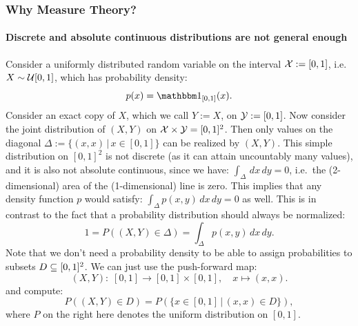 \subsubsection{Why Measure Theory?}%
%
\paragraph{Discrete and absolute continuous distributions are not general enough}%

\begin{Eg}%
    Consider a uniformly distributed random variable on the interval $\mathcal{X}:=[0,1]$, i.e.\ $X \sim \mathcal{U}[0,1]$, which has probability density:
    \[ p(x) = \I_{[0,1]}(x).\]
    Consider an exact copy of $X$, which we call $Y:=X$, on $\mathcal{Y} :=[0,1]$. Now consider the joint distribution of $(X,Y)$ 
    on $\mathcal{X} \times \mathcal{Y} = [0,1]^2$.
    Then only values on the diagonal $\Delta:=\{ (x,x) \,|\, x \in [0,1]\}$ can be realized by $(X,Y)$.
    This simple distribution on $[0,1]^2$ is not discrete (as it can attain uncountably many values), and it is also not 
    absolute continuous, since we have: $\int_\Delta \,dx\,dy = 0$, i.e.\ the (2-dimensional) area of the (1-dimensional) line is zero. 
    This implies that any density function $p$ would satisfy: $\int_\Delta p(x,y)\,dx\,dy =0$ as well. This is in contrast to the fact that a probability distribution should always be normalized:
    \[ 1 = P((X,Y) \in \Delta) = \int_\Delta p(x,y)\,dx\,dy.\]
    Note that we don't need a probability density to be able to assign probabilities to subsets $D \subseteq [0,1]^2$.
    We can just use  the push-forward map:
    \[(X,Y):\; [0,1] \to [0,1] \times [0,1], \quad x \mapsto (x,x).\]
    and compute:
    \[P((X,Y) \in D) = P(\{x \in [0,1]\,|\, (x,x) \in D\}),\]
    where $P$ on the right here denotes the uniform distribution on $[0,1]$.
\end{Eg}%

